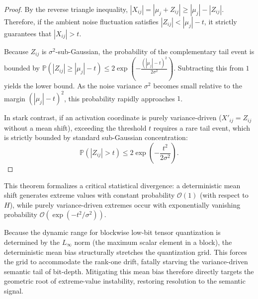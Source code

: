 \begin{proof}
By the reverse triangle inequality, $|X_{ij}| = |\mu_j + Z_{ij}| \ge |\mu_j| - |Z_{ij}|$. Therefore, if the ambient noise fluctuation satisfies $|Z_{ij}| < |\mu_j| - t$, it strictly guarantees that $|X_{ij}| > t$. 

Because $Z_{ij}$ is $\sigma^2$-sub-Gaussian, the probability of the complementary tail event is bounded by $\mathbb{P}(|Z_{ij}| \ge |\mu_j| - t) \le 2\exp\left(-\frac{(|\mu_j| - t)^2}{2\sigma^2}\right)$. Subtracting this from $1$ yields the lower bound. As the noise variance $\sigma^2$ becomes small relative to the margin $(|\mu_j| - t)^2$, this probability rapidly approaches $1$.

In stark contrast, if an activation coordinate is purely variance-driven ($X'_{ij} = Z_{ij}$ without a mean shift), exceeding the threshold $t$ requires a rare tail event, which is strictly bounded by standard sub-Gaussian concentration:
\begin{equation}
\mathbb{P}(|Z_{ij}| > t) \le 2\exp\left(-\frac{t^2}{2\sigma^2}\right).
\end{equation}
\end{proof}

This theorem formalizes a critical statistical divergence: a deterministic mean shift generates extreme values with constant probability $\mathcal{O}(1)$ (with respect to $H$), while purely variance-driven extremes occur with exponentially vanishing probability $\mathcal{O}(\exp(-t^2/\sigma^2))$. 

Because the dynamic range for blockwise low-bit tensor quantization is determined by the $L_\infty$ norm (the maximum scalar element in a block), the deterministic mean bias structurally stretches the quantization grid. This forces the grid to accommodate the rank-one drift, fatally starving the variance-driven semantic tail of bit-depth. Mitigating this mean bias therefore directly targets the geometric root of extreme-value instability, restoring resolution to the semantic signal.